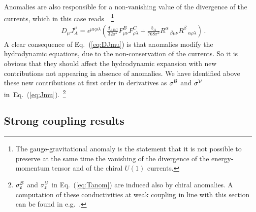 \documentclass[a4paper]{jpconf}
\begin{document}
Anomalies are also responsible for a non-vanishing value of the divergence of the currents, which in this case reads~\cite{AlvarezGaume:1983ig}~\footnote{The gauge-gravitational anomaly is the statement that it is not possible to preserve at the same time the vanishing of the divergence of the energy-momentum tensor and of the chiral $U(1)$ currents.}
\begin{eqnarray}
&&D_\mu J_A^\mu= \epsilon^{\mu\nu\rho\lambda}\left( \frac{d_{ABC}}{32\pi^2} F^B_{\mu\nu} F^C_{\rho\lambda} + \frac{b_A}{768\pi^2} 
R^\alpha\,_{\beta\mu\nu} R^\beta\,_{\alpha\rho\lambda}  \right) \,.  \label{eq:DJmu}
\end{eqnarray}
A clear consequence of Eq.~(\ref{eq:DJmu}) is that anomalies modify the hydrodynamic equations, due to the non-conservation of the currents. So it is obvious that they should affect the hydrodynamic expansion with new contributions not appearing in absence of anomalies. We have identified above these new contributions at first order in derivatives as $\sigma^{\cal B}$ and $\sigma^{\cal V}$ in~Eq.~(\ref{eq:Jmu}).~\footnote{$\sigma_{\varepsilon}^{{\cal B}}$ and $\sigma_{\varepsilon}^{{\cal V}}$ in Eq.~(\ref{eq:Tanom}) are induced also by chiral anomalies. A computation of these conductivities at weak coupling in line with this section can be found in e.g.~\cite{Landsteiner:2012kd,Landsteiner:2013aba}.}



\subsection{Strong coupling results}
\label{subsec:strong_coupling}
\end{document}
